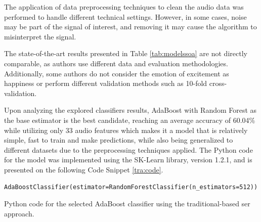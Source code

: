 The application of data preprocessing techniques to clean the audio data was performed to handle different technical settings. However, in some cases, noise may be part of the signal of interest, and removing it may cause the algorithm to misinterpret the signal.

The state-of-the-art results presented in Table \ref{tab:modelssoa} are not directly comparable, as authors use different data and evaluation methodologies. Additionally, some authors do not consider the emotion of excitement as happiness or perform different validation methods such as 10-fold cross-validation.

Upon analyzing the explored classifiers results, AdaBoost with Random Forest as the base estimator is the best candidate, reaching an average accuracy of 60.04\% while utilizing only 33 audio features which makes it a model that is relatively simple, fast to train and make predictions, while also being generalized to different datasets due to the preprocessing techniques applied. The Python code for the model was implemented using the SK-Learn library, version 1.2.1, and is presented on the following  Code Snippet \ref{tra:code}.

\begin{listing}[H]
	\begin{verbatim}
AdaBoostClassifier(estimator=RandomForestClassifier(n_estimators=512))
	\end{verbatim}
	\caption{Python code for the selected AdaBoost classifier using the traditional-based \ac{ser} approach.}
	\label{tra:code}
\end{listing}